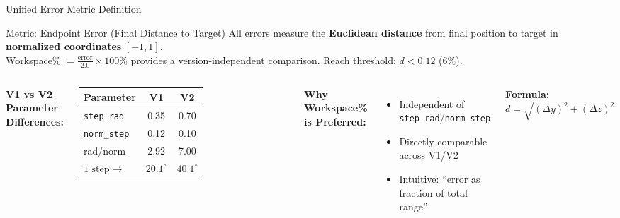 \documentclass[aspectratio=169, 11pt]{beamer}
\begin{document}
\begin{frame}{Unified Error Metric Definition}
    \begin{block}{Metric: Endpoint Error (Final Distance to Target)}
    \small
    All errors measure the \textbf{Euclidean distance} from final position to target in \textbf{normalized coordinates} $[-1, 1]$. \\
    Workspace\% $= \frac{\text{error}}{2.0} \times 100\%$ provides a version-independent comparison. Reach threshold: $d < 0.12$ ($6\%$).
    \end{block}
    
    \vspace{1mm}
    
    \begin{columns}[T]
        \textbf{V1 vs V2 Parameter Differences:}
        \begin{table}
            \centering
            \footnotesize
            \begin{tabular}{lcc}
                \toprule
                Parameter & V1 & V2 \\
                \midrule
                \texttt{step\_rad} & 0.35 & 0.70 \\
                \texttt{norm\_step} & 0.12 & 0.10 \\
                rad/norm & 2.92 & 7.00 \\
                $1 \text{ step} \to$ & $20.1^\circ$ & $40.1^\circ$ \\
                \bottomrule
            \end{tabular}
        \end{table}
        
        \textbf{Why Workspace\% is Preferred:}
        \begin{itemize}
            \item Independent of \texttt{step\_rad}/\texttt{norm\_step}
            \item Directly comparable across V1/V2
            \item Intuitive: ``error as fraction of total range''
        \end{itemize}
        
        \vspace{1mm}
        \textbf{Formula:} $d = \sqrt{(\Delta y)^2 + (\Delta z)^2}$
    \end{columns}
\end{frame}
\end{document}
